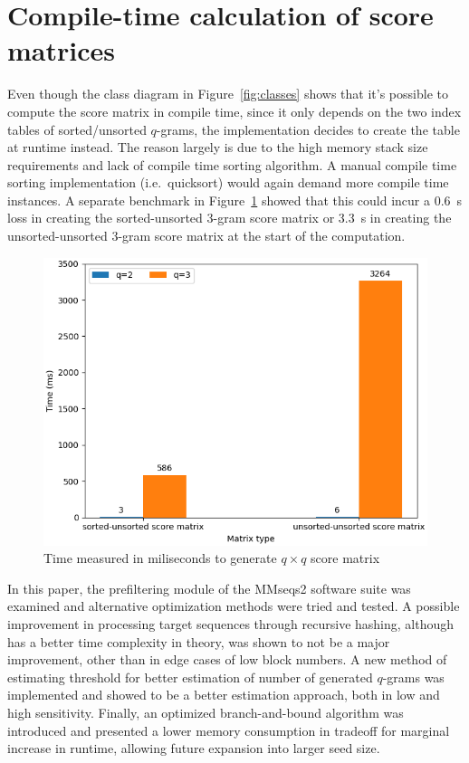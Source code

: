 \documentclass[twoside,a4paper,bsc]{master}
\newcommand{\Qgram}[1]{\(#1\)-gram}
\begin{document}
\section{Compile-time calculation of
score matrices\label{section:scorematrix}}
Even though the class diagram in Figure~\ref{fig:classes} shows that it's
possible to compute the score matrix in compile time, since it only depends
on the two index tables of sorted/unsorted \Qgram{q}s, the implementation
decides to create the table at runtime instead. The reason largely is due
to the high memory stack size requirements and lack of compile time sorting
algorithm. A manual compile time sorting implementation (i.e.\ quicksort)
would again demand more compile time instances. A separate benchmark in
Figure~\ref{fig:scorematrix} showed that this could incur a 0.6~s loss in
creating the sorted-unsorted \Qgram{3} score matrix or 3.3~s in creating
the unsorted-unsorted \Qgram{3} score matrix at the start of the
computation.
\begin{figure}
\centering
\includegraphics[scale=0.7]{graphics/scorematrix.png}
\caption{Time measured in miliseconds to generate \(q\times q\) score
matrix}
\label{fig:scorematrix}
\end{figure}
In this paper, the prefiltering module of the MMseqs2 software suite was
examined and alternative optimization methods were tried and tested. A
possible improvement in processing target sequences through recursive
hashing, although has a better time complexity in theory, was shown to not
be a major improvement, other than in edge cases of low block numbers. A
new method of estimating threshold for better estimation of number of
generated \Qgram{q}s was implemented and showed to be a better estimation
approach, both in low and high sensitivity. Finally, an optimized
branch-and-bound algorithm was introduced and presented a lower memory
consumption in tradeoff for marginal increase in runtime, allowing future
expansion into larger seed size.
\newpage
\small


\normalsize
\end{document}
